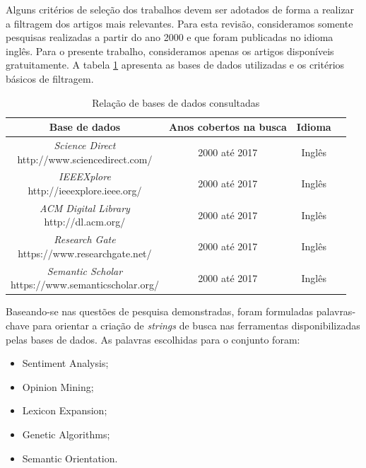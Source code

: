 \documentclass[12pt]{article}
\begin{document}
Alguns critérios de seleção dos trabalhos devem ser adotados de forma a realizar a filtragem dos artigos mais relevantes. Para esta revisão, consideramos somente pesquisas realizadas a partir do ano 2000 e que foram publicadas no idioma inglês. Para o presente trabalho, consideramos apenas os artigos disponíveis gratuitamente. A tabela \ref{tab:tab_bases} apresenta as bases de dados utilizadas e os critérios básicos de filtragem.


\begin{table}[ht]
\centering
\begin{tabular}{| c | c | c | c |}
\hline
\textbf{Base de dados} & \textbf{Anos cobertos na busca} & \textbf{Idioma} \\
\hline
\makecell{\emph{Science Direct} \\ http://www.sciencedirect.com/} & 2000 até 2017 & Inglês \\
\hline
\makecell{\emph{IEEEXplore} \\ http://ieeexplore.ieee.org/} & 2000 até 2017 & Inglês \\
\hline
\makecell{\emph{ACM Digital Library} \\http://dl.acm.org/} & 2000 até 2017 & Inglês \\
\hline
\makecell{\emph{Research Gate} \\ https://www.researchgate.net/} & 2000 até 2017 & Inglês \\
\hline
\makecell{\emph{Semantic Scholar} \\ https://www.semanticscholar.org/} & 2000 até 2017 & Inglês \\
\hline

\end{tabular}
\caption{Relação de bases de dados consultadas}
\label{tab:tab_bases}
\end{table}


Baseando-se nas questões de pesquisa demonstradas, foram formuladas palavras-chave para orientar a criação de \emph{strings} de busca nas ferramentas disponibilizadas pelas bases de dados. As palavras escolhidas para o conjunto foram:

\begin{itemize}
	\item{Sentiment Analysis;}
	\item{Opinion Mining;}
	\item{Lexicon Expansion;}
	\item{Genetic Algorithms;}
	\item{Semantic Orientation.}
\end{itemize}
\end{document}
